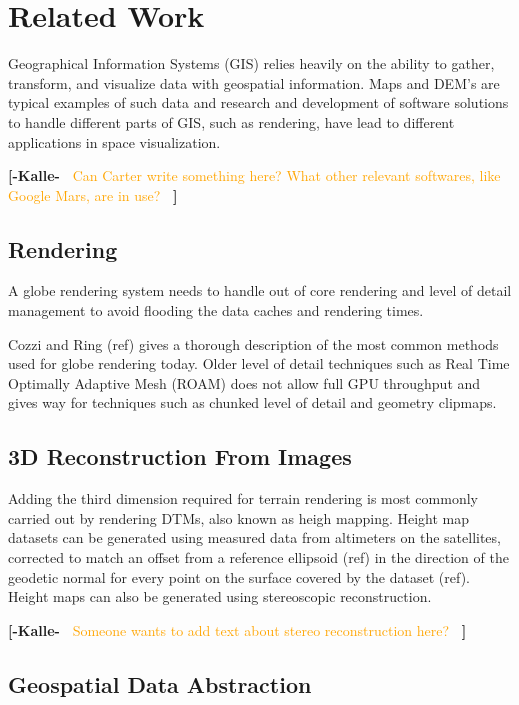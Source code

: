 \documentclass[journal]{vgtc}                %
\newcommand{\kallecomment}[1]{\textbf{[-Kalle-~}
    \textcolor{orange}{#1}
    \textbf{~]}}
\begin{document}
\section{Related Work} \label{sec:relatedwork}

Geographical Information Systems (GIS) relies heavily on the ability to gather, transform, and visualize data with geospatial information.
Maps and DEM's are typical examples of such data and research and development of software solutions to handle different parts of GIS, such as rendering, have lead to different applications in space visualization.

\kallecomment{Can Carter write something here? What other relevant softwares, like Google Mars, are in use?}

\subsection{Rendering}

A globe rendering system needs to handle out of core rendering and level of detail management to avoid flooding the data caches and rendering times.

Cozzi and Ring (ref) gives a thorough description of the most common methods used for globe rendering today.
Older level of detail techniques such as Real Time Optimally Adaptive Mesh (ROAM) does not allow full GPU throughput and gives way for techniques such as chunked level of detail and geometry clipmaps.


\subsection{3D Reconstruction From Images}

Adding the third dimension required for terrain rendering is most commonly carried out by rendering DTMs, also known as heigh mapping.
Height map datasets can be generated using measured data from altimeters on the satellites, corrected to match an offset from a reference ellipsoid (ref) in the direction of the geodetic normal for every point on the surface covered by the dataset (ref).
Height maps can also be generated using stereoscopic reconstruction.

\kallecomment{Someone wants to add text about stereo reconstruction here?}

\subsection{Geospatial Data Abstraction}
\end{document}
